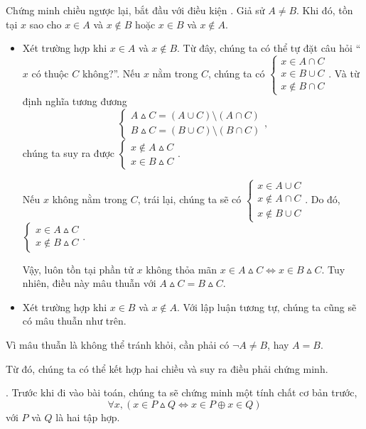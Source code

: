 Chứng minh chiều ngược lại, bắt đầu với điều kiện . Giả sử $A \neq B$. Khi đó, tồn tại $x$ sao cho $x \in A$ và $x \notin B$ hoặc $x \in B$ và $x \notin A$. 
\begin{itemize}
   \item Xét trường hợp khi $x \in A$ và $x \notin B$. Từ đây, chúng ta có thể tự đặt câu hỏi ``$x$ có thuộc $C$ không?''. Nếu $x$ nằm trong $C$, chúng ta có $\begin{cases}
      x \in A \cap C \\
      x \in B \cup C \\
      x \notin B \cap C
   \end{cases}$. Và từ định nghĩa tương đương $$\begin{cases}
      A \vartriangle C = (A \cup C) \setminus (A \cap C) \\
      B \vartriangle C = (B \cup C) \setminus (B \cap C)
   \end{cases},$$ chúng ta suy ra được $
      \begin{cases}
         x \notin A \vartriangle C \\
         x \in B \vartriangle C
      \end{cases}$.

   Nếu $x$ không nằm trong $C$, trái lại, chúng ta sẽ có $\begin{cases}
      x \in A \cup C \\
      x \notin A \cap C \\
      x \notin B \cup C
   \end{cases}$. Do đó, $\begin{cases}
      x \in A \vartriangle C \\
      x \notin B \vartriangle C 
   \end{cases}$.

   Vậy, luôn tồn tại phần tử $x$ không thỏa mãn $x \in A \vartriangle C \iff x \in B \vartriangle C$. Tuy nhiên, điều này mâu thuẫn với $A \vartriangle C = B \vartriangle C$.
   \item Xét trường hợp khi $x \in B$ và $x \notin A$. Với lập luận tương tự, chúng ta cũng sẽ có mâu thuẫn như trên.
\end{itemize}

Vì mâu thuẫn là không thể tránh khỏi, cần phải có $\neg A \neq B$, hay $A = B$.

Từ đó, chúng ta có thể kết hợp hai chiều và suy ra điều phải chứng minh. 

. Trước khi đi vào bài toán, chúng ta sẽ chứng minh một tính chất cơ bản trước, $$\forall x, \left(x \in P \vartriangle Q \iff x \in P \oplus x \in Q\right)$$ với $P$ và $Q$ là hai tập hợp.


